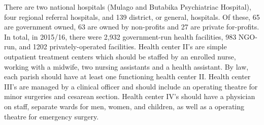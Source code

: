 \documentclass[12pt]{article} %
\begin{document}
There are two national hospitals (Mulago and Butabika Psychiatriac Hospital), four regional referral hospitals, and 139 district, or general, hospitals. Of these, 65 are government owned, 63 are owned by non-profits and 27 are private for-profits.
\cite{MOH-hosp-list}
In total, in 2015/16, there were 2,932 government-run health facilities, 983 NGO-run, and 1202 privately-operated facilities.
Health center II’s are simple outpatient treatment centers which should be staffed by an enrolled nurse, working with a midwife, two nursing assistants and a health assistant. By law, each parish should have at least one functioning health center II. 
Health center III’s are managed by a clinical officer and should include an operating theatre for minor surgeries and cesarean section. Health center IV’s should have a physician on staff, separate wards for men, women, and children, as well as a operating theatre for emergency surgery.
\end{document}
